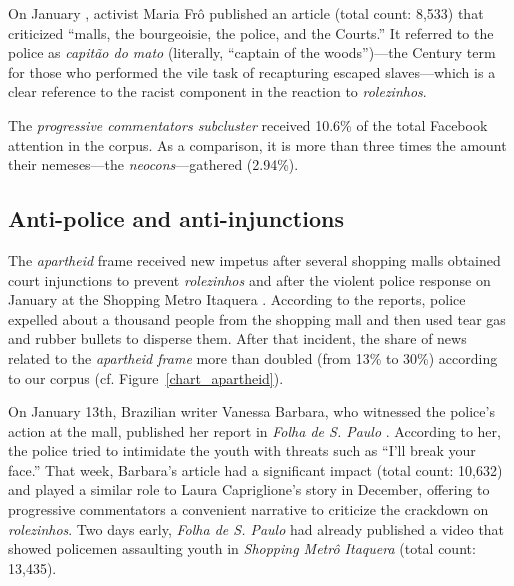 On January , activist Maria Frô published an article \autocite{maria_fro} (total count: 8,533) that criticized \enquote{malls, the bourgeoisie, the police, and the Courts.} It referred to the police as \emph{capitão do mato} (literally, \enquote{captain of the woods})---the  Century term for those who performed the vile task of recapturing escaped slaves---which is a clear reference to the racist component in the reaction to \emph{rolezinhos}.

The \emph{progressive commentators subcluster} received 10.6\% of the total Facebook attention in the corpus. As a comparison, it is more than three times the amount their nemeses---the \emph{neocons}---gathered (2.94\%).

\subsection*{Anti-police and anti-injunctions}

The \emph{apartheid} frame received new impetus after several shopping malls obtained court injunctions to prevent \emph{rolezinhos} \autocite{folha_liminar_shoppings,estado_liminar_shoppings,veja_liminar_shoppings,g1_liminar_shoppings,band_liminar_shoppings} and after the violent police response on January  at the Shopping Metro Itaquera \autocite{band_confronto_itaquera,folha_confronto_itaquera,ig_confronto_itaquera,estado_confronto_itaquera,g1_confronto_itaquera,r7_confronto_itaquera}. According to the reports, police expelled about a thousand people from the shopping mall and then used tear gas and rubber bullets to disperse them. After that incident, the share of news related to the \emph{apartheid frame} more than doubled (from 13\% to 30\%) according to our corpus (cf. Figure~\ref{chart_apartheid}).

On January 13th, Brazilian writer Vanessa Barbara, who witnessed the police's action at the mall, published her report in \emph{Folha de S. Paulo} \autocite{folha_vanessa}. According to her, the police tried to intimidate the youth with threats such as \enquote{I'll break your face.} That week, Barbara's article had a significant impact (total count: 10,632) and played a similar role to Laura Capriglione's story \autocite{folha_laura} in December, offering to progressive commentators a convenient narrative to criticize the crackdown on \emph{rolezinhos}. Two days early, \emph{Folha de S. Paulo} had already published a video that showed policemen assaulting youth in \emph{Shopping Metrô Itaquera} \autocite{folha_pms_agredindo} (total count: 13,435).

